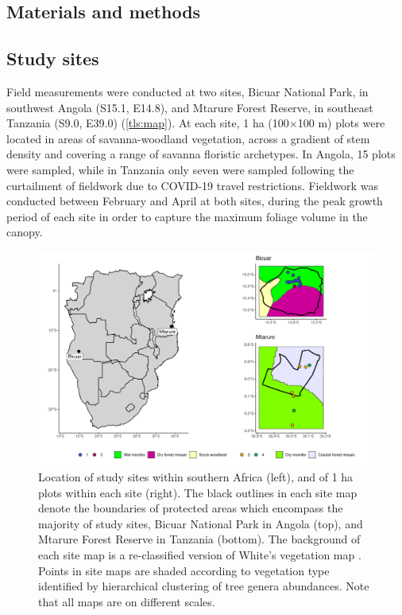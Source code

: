 \begin{refsection}
\section{Materials and methods}
\label{tls:sec:methods}

\subsection{Study sites}
\label{tls:ssec:location}

Field measurements were conducted at two sites, Bicuar National Park, in southwest Angola (S15.1\textdegree, E14.8\textdegree), and Mtarure Forest Reserve, in southeast Tanzania (S9.0\textdegree, E39.0\textdegree) (\autoref{tls:map}). At each site, 1 ha (100$\times$100 m) plots were located in areas of savanna-woodland vegetation, across a gradient of stem density and covering a range of savanna floristic archetypes. In Angola, 15 plots were sampled, while in Tanzania only seven were sampled following the curtailment of fieldwork due to COVID-19 travel restrictions. Fieldwork was conducted between February and April at both sites, during the peak growth period of each site in order to capture the maximum foliage volume in the canopy.

\begin{figure}
	\includegraphics[width=\linewidth]{img/map}
	\caption[Maps of study sites and plots]{Location of study sites within southern Africa (left), and of 1 ha plots within each site (right). The black outlines in each site map denote the boundaries of protected areas which encompass the majority of study sites, Bicuar National Park in Angola (top), and Mtarure Forest Reserve in Tanzania (bottom). The background of each site map is a re-classified version of White's vegetation map \citep{White1983}. Points in site maps are shaded according to vegetation type identified by hierarchical clustering of tree genera abundances. Note that all maps are on different scales.}
	\label{tls:map}
\end{figure}


\end{refsection}
